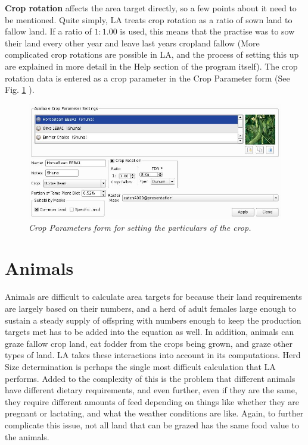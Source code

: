  \textbf{Crop rotation} affects the area target
  directly, so a few points about it need to be mentioned.  Quite simply, LA
  treats crop rotation as a ratio of sown land to fallow land.  If a ratio of
  $1:1.00$ is used, this means that the practise was to sow their land every
  other year and leave last years cropland fallow (More complicated crop
  rotations are possible in LA, and the process of setting this up are
  explained in more detail in the Help section of the program itself).  The
  crop rotation data is entered as a crop parameter in the Crop Parameter form
  (See Fig. \ref{fig:cropParameters} ).
    \begin{figure}[htbp] %
        \includegraphics[scale=.28]{./images/cropParameters.jpg}
      \caption[Crop Parameters]{\label{fig:cropParameters}\textit{Crop
Parameters form for setting the particulars of the crop.}}
    \end{figure}


\section{Animals}
Animals are difficult to calculate area targets for because their land
requirements are largely based on their numbers, and a herd of adult
females large enough to sustain a steady supply of offspring with numbers
enough to keep the production targets met has to be added into the equation as
well.  In addition, animals can graze fallow crop land, eat fodder from
the crops being grown, and graze other types of land.  LA takes these
interactions into account in its computations.
Herd Size determination is perhaps the single most difficult calculation that
LA performs.  Added to the complexity of this is the problem that different
animals have different dietary requirements, and even further, even if they
are the same, they require different amounts of feed depending on things like
whether they are pregnant or lactating, and what the weather conditions are
like.  Again, to further complicate this issue, not all land that can be
grazed has the same food value to the animals.


